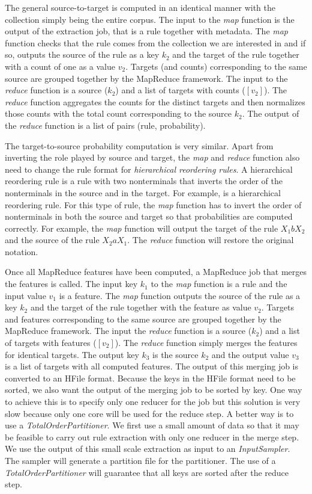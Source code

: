 The general source-to-target is computed in an identical manner with the
collection simply being the entire corpus. The input to the \emph{map} function
is the output of the extraction job, that is a rule together with metadata.
The \emph{map} function checks that the rule comes from the collection we are
interested in and if so, outputs the source of the rule as a key $k_2$ and the
target of the rule together with a count of one as a value $v_2$. Targets (and
counts) corresponding to the same source are grouped together by the MapReduce
framework. The input to the \emph{reduce} function is a source ($k_2$) and
a list of targets with counts ($[v_2]$). The \emph{reduce} function aggregates
the counts for the distinct targets and then normalizes those counts with the
total count corresponding to the source $k_2$. The output of the \emph{reduce}
function is a list of pairs (rule, probability).

The target-to-source probability computation is very similar. Apart from
inverting the role played by source and target, the \emph{map} and \emph{reduce}
function also need to change the rule format for
\emph{hierarchical reordering rules}.
A hierarchical reordering rule is a rule with two nonterminals that inverts the
order of the nonterminals in the source and in the target. For example,
\RT[$X$][$X_1 a X_2$][$X_2 b X_1$] is a hierarchical reordering rule. For this
type of rule, the \emph{map} function has to invert the order of nonterminals
in both the source and target so that probabilities are computed correctly. For
example, the \emph{map} function will output the target of the rule
$X_1 b X_2$ and the source of the rule $X_2 a X_1$. The \emph{reduce} function
will restore the original notation.

Once all MapReduce features have been computed, a MapReduce job that merges
the features is called. The input key $k_1$ to the \emph{map} function is a
rule and the input value $v_1$ is a feature. The \emph{map} function outputs
the source of the rule as a key $k_2$ and the target of the rule together with
the feature as value $v_2$. Targets and features corresponding to the same
source are grouped together by the MapReduce framework. The input the
\emph{reduce} function is a source ($k_2$) and a list of targets with features
($[v_2]$). The \emph{reduce} function simply merges the features for identical
targets. The output key $k_3$ is the source $k_2$ and the output value $v_3$ is
a list of targets with all computed features. The output of this merging job
is converted to an HFile format. Because the keys in the HFile format need to
be sorted, we also want the output of the merging job to be sorted by key. One
way to achieve this is to specify only one reducer for the job but this solution
is very slow because only one core will be used for the reduce step. A better
way is to use a \emph{TotalOrderPartitioner}. We first use a small amount of
data so that it may be feasible to carry out rule extraction with only one
reducer in the merge step. We use the output of this small scale extraction as
input to an \emph{InputSampler}. The sampler will generate a partition file for
the partitioner. The use of a \emph{TotalOrderPartitioner} will guarantee that
all keys are sorted after the reduce step.


